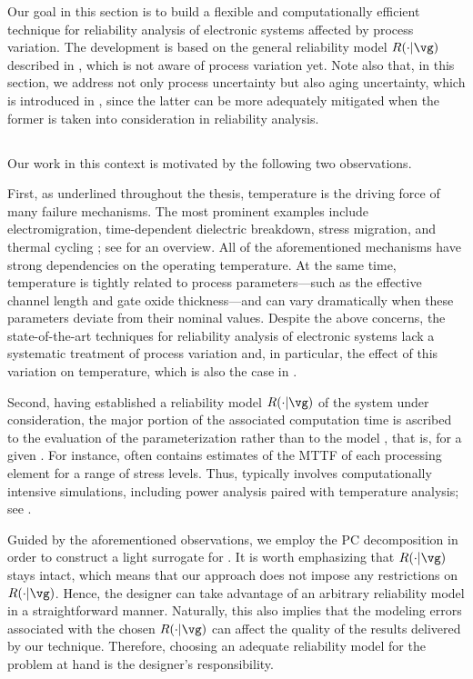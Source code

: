 Our goal in this section is to build a flexible and computationally efficient
technique for reliability analysis of electronic systems affected by process
variation. The development is based on the general reliability model $R(\cdot |
\vg)$ described in , which is not aware of process
variation yet. Note also that, in this section, we address not only process
uncertainty but also aging uncertainty, which is introduced in
, since the latter can be more adequately mitigated when
the former is taken into consideration in reliability analysis.

\subsection{\problemtitle}

Our work in this context is motivated by the following two observations.

First, as underlined throughout the thesis, temperature is the driving force of
many failure mechanisms. The most prominent examples include electromigration,
time-dependent dielectric breakdown, stress migration, and thermal cycling
\cite{xiang2010}; see \cite{jedec2016} for an overview. All of the
aforementioned mechanisms have strong dependencies on the operating temperature.
At the same time, temperature is tightly related to process parameters---such as
the effective channel length and gate oxide thickness---and can vary
dramatically when these parameters deviate from their nominal values. Despite
the above concerns, the state-of-the-art techniques for reliability analysis of
electronic systems lack a systematic treatment of process variation and, in
particular, the effect of this variation on temperature, which is also the case
in .

Second, having established a reliability model $R(\cdot | \vg)$ of the system
under consideration, the major portion of the associated computation time is
ascribed to the evaluation of the parameterization \vg rather than to the model
\perse, that is, for a given \vg. For instance, \vg often contains estimates of
the \ac{MTTF} of each processing element for a range of stress levels. Thus, \vg
typically involves computationally intensive simulations, including power
analysis paired with temperature analysis; see .

Guided by the aforementioned observations, we employ the \ac{PC} decomposition
in order to construct a light surrogate for \vg. It is worth emphasizing that
$R(\cdot | \vg)$ stays intact, which means that our approach does not impose any
restrictions on $R(\cdot | \vg)$. Hence, the designer can take advantage of an
arbitrary reliability model in a straightforward manner. Naturally, this also
implies that the modeling errors associated with the chosen $R(\cdot | \vg)$ can
affect the quality of the results delivered by our technique. Therefore,
choosing an adequate reliability model for the problem at hand is the designer's
responsibility.


